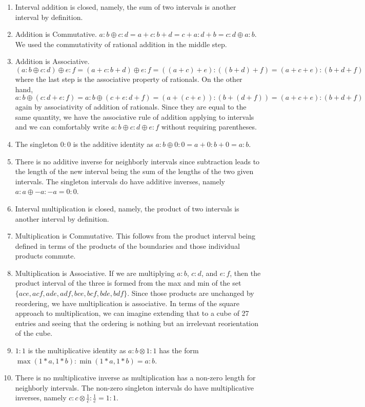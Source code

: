 \documentclass[12pt]{article}
\begin{document}
\begin{enumerate}
    \item Interval addition is closed, namely, the sum of two intervals is another interval by definition. 
    \item Addition is Commutative. $a:b \oplus c:d= a+c : b+d = c+a:d+b = c:d \oplus a:b$. We used the commutativity of rational addition in the middle step. 
    \item Addition is Associative. $(a:b \oplus c:d) \oplus e:f = (a+c:b+d) \oplus e:f = ((a+c)+e):((b+d)+f) = (a+c+e):(b+d+f)$ where the last step is the associative property of rationals.  On the other hand, $a:b \oplus (c:d+e:f) = a:b \oplus (c+e:d+f) = (a+(c+e)):(b+(d+f)) = (a+c+e):(b+d+f)$ again by associativity of addition of rationals. Since they are equal to the same quantity, we have the associative rule of addition applying to intervals and we can comfortably write $a:b \oplus c:d \oplus e:f$ without requiring parentheses. 
    \item The singleton $0:0$ is the additive identity as $a:b \oplus 0:0 = a+0:b+0 = a:b$. 
    \item There is no additive inverse for neighborly intervals since subtraction leads to the length of the new interval being the sum of the lengths of the two given intervals. The singleton intervals do have additive inverses, namely $a:a \oplus -a:-a = 0:0$. 
    \item Interval multiplication is closed, namely, the product of two intervals is another interval by definition. 
    \item Multiplication is Commutative. This follows from the product interval being defined in terms of the products of the boundaries and those individual products commute. 
    \item Multiplication is Associative. If we are multiplying $a:b$, $c:d$, and $e:f$, then the product interval of the three is formed from the max and min of the set $\{ace, acf, ade, adf, bce, bcf, bde, bdf\}$. Since those products are unchanged by reordering, we have multiplication is associative. In terms of the square approach to multiplication, we can imagine extending that to a cube of 27 entries and seeing that the ordering is nothing but an irrelevant reorientation of the cube. 
    \item $1:1$ is the multiplicative identity as $a:b \otimes 1:1$ has the form $\max(1*a, 1*b):\min(1*a, 1*b) = a:b$. 
    \item There is no multiplicative inverse as multiplication has a non-zero length for neighborly intervals. The non-zero singleton intervals do have multiplicative inverses, namely $c:c  \otimes  \frac{1}{c} : \frac{1}{c} = 1:1$.
\end{enumerate}
\end{document}
